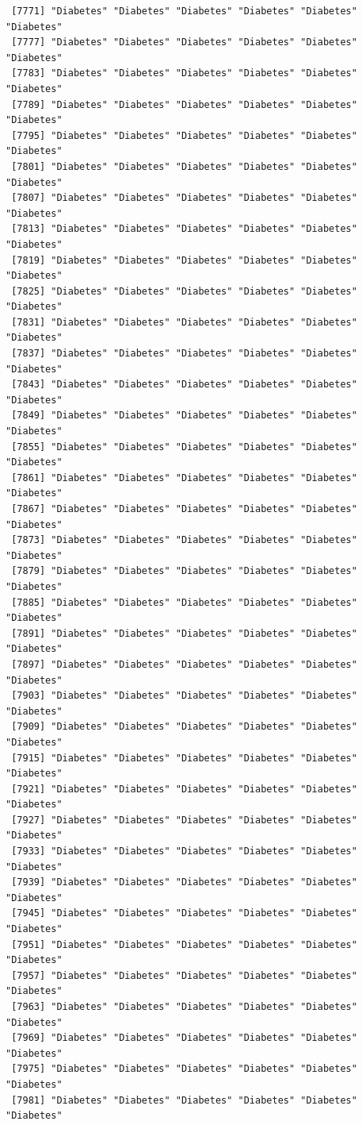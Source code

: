 \documentclass[
  letterpaper,
  DIV=11,
  numbers=noendperiod]{scrartcl}
\begin{document}
\begin{verbatim}
 [7771] "Diabetes" "Diabetes" "Diabetes" "Diabetes" "Diabetes" "Diabetes"
 [7777] "Diabetes" "Diabetes" "Diabetes" "Diabetes" "Diabetes" "Diabetes"
 [7783] "Diabetes" "Diabetes" "Diabetes" "Diabetes" "Diabetes" "Diabetes"
 [7789] "Diabetes" "Diabetes" "Diabetes" "Diabetes" "Diabetes" "Diabetes"
 [7795] "Diabetes" "Diabetes" "Diabetes" "Diabetes" "Diabetes" "Diabetes"
 [7801] "Diabetes" "Diabetes" "Diabetes" "Diabetes" "Diabetes" "Diabetes"
 [7807] "Diabetes" "Diabetes" "Diabetes" "Diabetes" "Diabetes" "Diabetes"
 [7813] "Diabetes" "Diabetes" "Diabetes" "Diabetes" "Diabetes" "Diabetes"
 [7819] "Diabetes" "Diabetes" "Diabetes" "Diabetes" "Diabetes" "Diabetes"
 [7825] "Diabetes" "Diabetes" "Diabetes" "Diabetes" "Diabetes" "Diabetes"
 [7831] "Diabetes" "Diabetes" "Diabetes" "Diabetes" "Diabetes" "Diabetes"
 [7837] "Diabetes" "Diabetes" "Diabetes" "Diabetes" "Diabetes" "Diabetes"
 [7843] "Diabetes" "Diabetes" "Diabetes" "Diabetes" "Diabetes" "Diabetes"
 [7849] "Diabetes" "Diabetes" "Diabetes" "Diabetes" "Diabetes" "Diabetes"
 [7855] "Diabetes" "Diabetes" "Diabetes" "Diabetes" "Diabetes" "Diabetes"
 [7861] "Diabetes" "Diabetes" "Diabetes" "Diabetes" "Diabetes" "Diabetes"
 [7867] "Diabetes" "Diabetes" "Diabetes" "Diabetes" "Diabetes" "Diabetes"
 [7873] "Diabetes" "Diabetes" "Diabetes" "Diabetes" "Diabetes" "Diabetes"
 [7879] "Diabetes" "Diabetes" "Diabetes" "Diabetes" "Diabetes" "Diabetes"
 [7885] "Diabetes" "Diabetes" "Diabetes" "Diabetes" "Diabetes" "Diabetes"
 [7891] "Diabetes" "Diabetes" "Diabetes" "Diabetes" "Diabetes" "Diabetes"
 [7897] "Diabetes" "Diabetes" "Diabetes" "Diabetes" "Diabetes" "Diabetes"
 [7903] "Diabetes" "Diabetes" "Diabetes" "Diabetes" "Diabetes" "Diabetes"
 [7909] "Diabetes" "Diabetes" "Diabetes" "Diabetes" "Diabetes" "Diabetes"
 [7915] "Diabetes" "Diabetes" "Diabetes" "Diabetes" "Diabetes" "Diabetes"
 [7921] "Diabetes" "Diabetes" "Diabetes" "Diabetes" "Diabetes" "Diabetes"
 [7927] "Diabetes" "Diabetes" "Diabetes" "Diabetes" "Diabetes" "Diabetes"
 [7933] "Diabetes" "Diabetes" "Diabetes" "Diabetes" "Diabetes" "Diabetes"
 [7939] "Diabetes" "Diabetes" "Diabetes" "Diabetes" "Diabetes" "Diabetes"
 [7945] "Diabetes" "Diabetes" "Diabetes" "Diabetes" "Diabetes" "Diabetes"
 [7951] "Diabetes" "Diabetes" "Diabetes" "Diabetes" "Diabetes" "Diabetes"
 [7957] "Diabetes" "Diabetes" "Diabetes" "Diabetes" "Diabetes" "Diabetes"
 [7963] "Diabetes" "Diabetes" "Diabetes" "Diabetes" "Diabetes" "Diabetes"
 [7969] "Diabetes" "Diabetes" "Diabetes" "Diabetes" "Diabetes" "Diabetes"
 [7975] "Diabetes" "Diabetes" "Diabetes" "Diabetes" "Diabetes" "Diabetes"
 [7981] "Diabetes" "Diabetes" "Diabetes" "Diabetes" "Diabetes" "Diabetes"

\end{verbatim}
\end{document}
